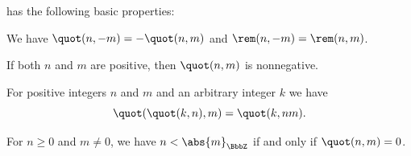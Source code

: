 \begin{proposition}\label{thm:alg:integer_division}
   has the following basic properties:
  \begin{thmenum}
     We have \( \quot(n, -m) = -\quot(n, m) \) and \( \rem(n, -m) = \rem(n, m) \).

     If both \( n \) and \( m \) are positive, then \( \quot(n, m) \) is nonnegative.

     For positive integers \( n \) and \( m \) and an arbitrary integer \( k \) we have
    \begin{equation}\label{eq:thm:alg:integer_division/nested_quot}
      \quot(\quot(k, n), m) = \quot(k, nm).
    \end{equation}

     For \( n \geq 0 \) and \( m \neq 0 \), we have \( n < \abs{m}_\BbbZ \) if and only if \( \quot(n, m) = 0 \).
  \end{thmenum}
\end{proposition}
